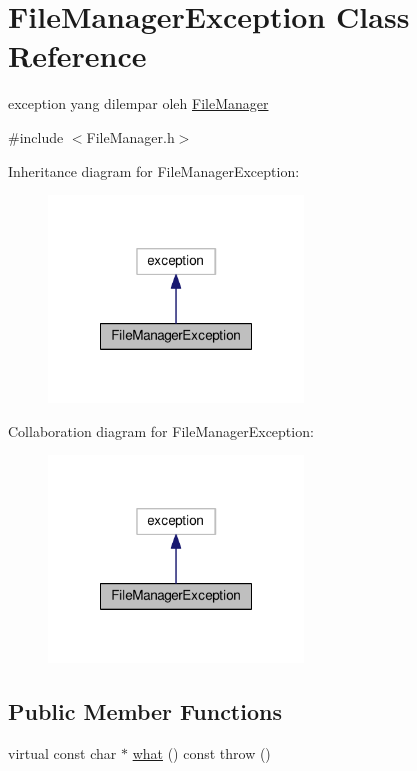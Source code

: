 \hypertarget{class_file_manager_exception}{\section{File\-Manager\-Exception Class Reference}
\label{class_file_manager_exception}
}


exception yang dilempar oleh \hyperlink{class_file_manager}{File\-Manager}  




{\ttfamily \#include $<$File\-Manager.\-h$>$}



Inheritance diagram for File\-Manager\-Exception\-:\nopagebreak
\begin{figure}[H]
\begin{center}
\leavevmode
\includegraphics[width=192pt]{class_file_manager_exception__inherit__graph}
\end{center}
\end{figure}


Collaboration diagram for File\-Manager\-Exception\-:\nopagebreak
\begin{figure}[H]
\begin{center}
\leavevmode
\includegraphics[width=192pt]{class_file_manager_exception__coll__graph}
\end{center}
\end{figure}
\subsection*{Public Member Functions}
\begin{DoxyCompactItemize}
\item 
virtual const char $\ast$ \hyperlink{class_file_manager_exception_a4d2ded04871dadef8fae6978517fa6e2}{what} () const   throw ()
\end{DoxyCompactItemize}


